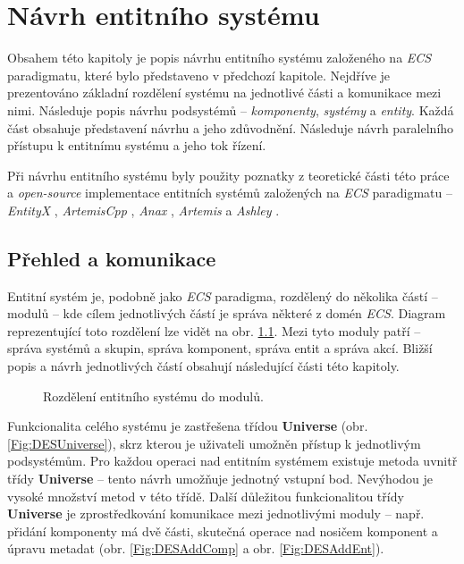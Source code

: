 \chapter{Návrh entitního systému}
\label{Chap:Design}

Obsahem této kapitoly je popis návrhu entitního systému založeného na \emph{ECS} paradigmatu, které bylo představeno v předchozí kapitole. Nejdříve je prezentováno základní rozdělení systému na jednotlivé části a komunikace mezi nimi. Následuje popis návrhu podsystémů -- \emph{komponenty}, \emph{systémy} a \emph{entity}. Každá část obsahuje představení návrhu a jeho zdůvodnění. Následuje návrh paralelního přístupu k entitnímu systému a jeho tok řízení.

Při návrhu entitního systému byly použity poznatky z teoretické části této práce a \emph{open-source} implementace entitních systémů založených na \emph{ECS} paradigmatu -- \emph{EntityX} \cite{EntityX}, \emph{ArtemisCpp} \cite{ArtemisCpp}, \emph{Anax} \cite{Anax}, \emph{Artemis} \cite{ArtemisJava} a \emph{Ashley} \cite{Ashley}.

\section{Přehled a komunikace}

Entitní systém je, podobně jako \emph{ECS} paradigma, rozdělený do několika částí -- modulů -- kde cílem jednotlivých částí je správa některé z domén \emph{ECS}. Diagram reprezentující toto rozdělení lze vidět na obr. \ref{Fig:DESModules}. Mezi tyto moduly patří -- správa systémů a skupin, správa komponent, správa entit a správa akcí. Bližší popis a návrh jednotlivých částí obsahují následující části této kapitoly.

\begin{figure}[H]
	\caption{Rozdělení entitního systému do modulů.}
	\label{Fig:DESModules}
\end{figure}

Funkcionalita celého systému je zastřešena třídou \textbf{Universe} (obr. \ref{Fig:DESUniverse}), skrz kterou je uživateli umožněn přístup k jednotlivým podsystémům. Pro každou operaci nad entitním systémem existuje metoda uvnitř třídy \textbf{Universe} -- tento návrh umožňuje jednotný vstupní bod. Nevýhodou je vysoké množství metod v této třídě. Další důležitou funkcionalitou třídy \textbf{Universe} je zprostředkování komunikace mezi jednotlivými moduly -- např. přidání komponenty má dvě části, skutečná operace nad nosičem komponent a úpravu metadat (obr. \ref{Fig:DESAddComp} a obr. \ref{Fig:DESAddEnt}). 

